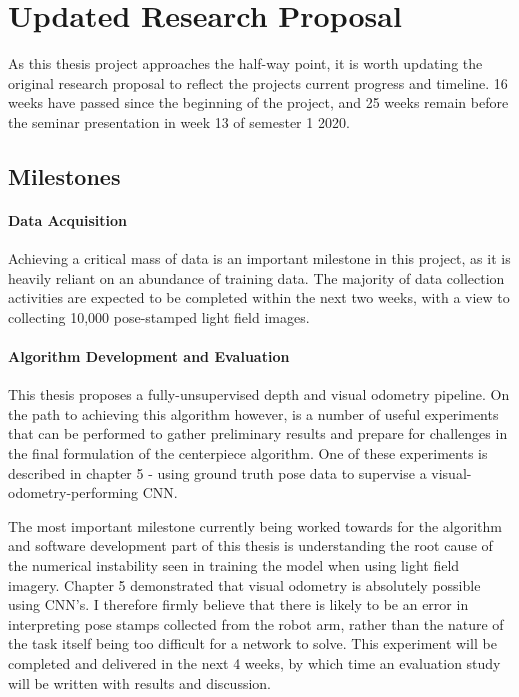 
\chapter{Updated Research Proposal}

As this thesis project approaches the half-way point, it is worth updating the original research proposal to reflect the projects current progress and timeline. 16 weeks have passed since the beginning of the project, and 25 weeks remain before the seminar presentation in week 13 of semester 1 2020.

\section{Milestones}

\subsubsection{Data Acquisition}
Achieving a critical mass of data is an important milestone in this project, as it is heavily reliant on an abundance of training data. The majority of data collection activities are expected to be completed within the next two weeks, with a view to collecting 10,000 pose-stamped light field images. 

\subsubsection{Algorithm Development and Evaluation}
This thesis proposes a fully-unsupervised depth and visual odometry pipeline. On the path to achieving this algorithm however, is a number of useful experiments that can be performed to gather preliminary results and prepare for challenges in the final formulation of the centerpiece algorithm. One of these experiments is described in chapter 5 - using ground truth pose data to supervise a visual-odometry-performing CNN. 

The most important milestone currently being worked towards for the algorithm and software development part of this thesis is understanding the root cause of the numerical instability seen in training the model when using light field imagery. Chapter 5 demonstrated that visual odometry is absolutely possible using CNN's. I therefore firmly believe that there is likely to be an error in interpreting pose stamps collected from the robot arm, rather than the nature of the task itself being too difficult for a network to solve. This experiment will be completed and delivered in the next 4 weeks, by which time an evaluation study will be written with results and discussion. 

